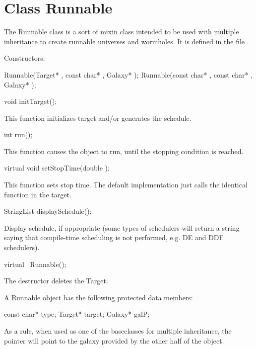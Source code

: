 \section{Class Runnable}

The Runnable class is a sort of mixin class intended to be used with
multiple inheritance to create runnable universes and wormholes.  It
is defined in the file .

Constructors:
\begin{example}
Runnable(Target* , const char* , Galaxy* );
Runnable(const char* , const char* , Galaxy* );
\end{example}

\begin{example}
void initTarget();
\end{example}

This function initializes target and/or generates the schedule.

\begin{example}
int run();
\end{example}

This function causes the object to run, until the stopping condition is reached.

\begin{example}
virtual void setStopTime(double );
\end{example}

This function sets stop time.  The default implementation just
calls the identical function in the target.

\begin{example}
StringList displaySchedule();
\end{example}

Display schedule, if appropriate (some types of schedulers will return a
string saying that compile-time scheduling is not performed, e.g. DE
and DDF schedulers).

\begin{example}
virtual ~Runnable();
\end{example}

The destructor deletes the Target.

A Runnable object has the following protected data members:

\begin{example}
const char* type;
Target* target;
Galaxy* galP;
\end{example}

As a rule, when used as one of the baseclasses for multiple inheritance,
the  pointer will point to the galaxy provided by the other
half of the object.

